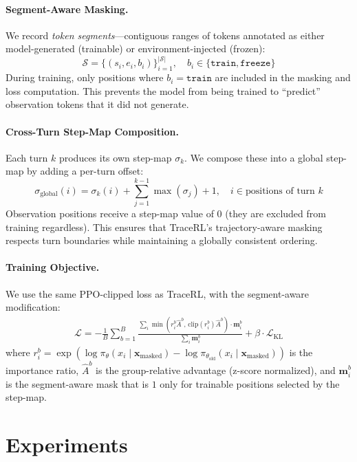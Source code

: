 \documentclass{article}
\begin{document}
\paragraph{Segment-Aware Masking.}
We record \emph{token segments}---contiguous ranges of tokens annotated as either model-generated (trainable) or environment-injected (frozen):
\[
\mathcal{S} = \{(s_i, e_i, b_i)\}_{i=1}^{|\mathcal{S}|}, \quad b_i \in \{\texttt{train}, \texttt{freeze}\}
\]
During training, only positions where $b_i = \texttt{train}$ are included in the masking and loss computation. This prevents the model from being trained to ``predict'' observation tokens that it did not generate.

\paragraph{Cross-Turn Step-Map Composition.}
Each turn $k$ produces its own step-map $\sigma_k$. We compose these into a global step-map by adding a per-turn offset:
\[
\sigma_{\text{global}}(i) = \sigma_k(i) + \sum_{j=1}^{k-1} \max(\sigma_j) + 1, \quad i \in \text{positions of turn } k
\]
Observation positions receive a step-map value of $0$ (they are excluded from training regardless). This ensures that TraceRL's trajectory-aware masking respects turn boundaries while maintaining a globally consistent ordering.

\paragraph{Training Objective.}
We use the same PPO-clipped loss as TraceRL, with the segment-aware modification:
\begin{align}
\mathcal{L} = -\frac{1}{B}\sum_{b=1}^{B} \frac{\sum_{i} \min\left(r_i^b \hat{A}^b,\, \text{clip}(r_i^b) \hat{A}^b\right) \cdot \mathbf{m}_i^b}{\sum_i \mathbf{m}_i^b} + \beta \cdot \mathcal{L}_{\text{KL}}
\end{align}
where $r_i^b = \exp(\log\pi_\theta(x_i \mid \mathbf{x}_{\text{masked}}) - \log\pi_{\theta_\text{old}}(x_i \mid \mathbf{x}_{\text{masked}}))$ is the importance ratio, $\hat{A}^b$ is the group-relative advantage (z-score normalized), and $\mathbf{m}_i^b$ is the segment-aware mask that is $1$ only for trainable positions selected by the step-map.

\section{Experiments}
\end{document}
